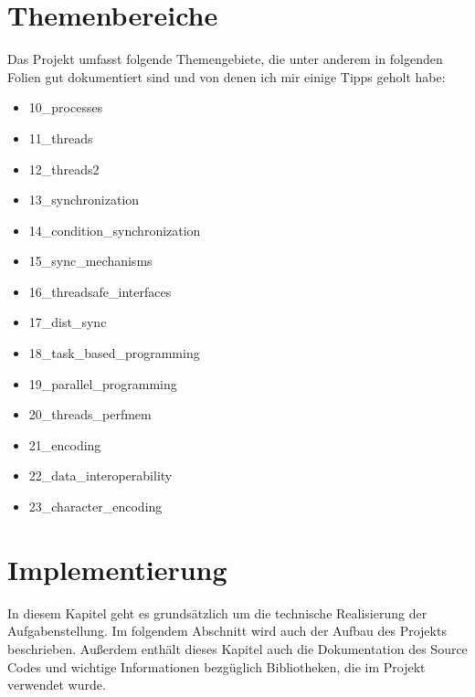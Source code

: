 \documentclass[a4paper,12pt]{article}
\begin{document}
\section{Themenbereiche}
Das Projekt umfasst folgende Themengebiete, die unter anderem in folgenden Folien gut dokumentiert sind und von denen ich mir einige Tipps geholt habe:
    \begin{itemize}
        \item  10\_processes
        \item  11\_threads
        \item  12\_threads2 
        \item  13\_synchronization 
        \item  14\_condition\_synchronization 
        \item  15\_sync\_mechanisms 
        \item  16\_threadsafe\_interfaces 
        \item  17\_dist\_sync 
        \item  18\_task\_based\_programming 
        \item  19\_parallel\_programming 
        \item  20\_threads\_perfmem
        \item  21\_encoding
        \item  22\_data\_interoperability
        \item  23\_character\_encoding
    \end{itemize} 
\newpage
\section{Implementierung}
In diesem Kapitel geht es grundsätzlich um die technische Realisierung der Aufgabenstellung. Im folgendem Abschnitt wird auch
der Aufbau des Projekts beschrieben. Außerdem enthält dieses Kapitel auch die Dokumentation des Source Codes und wichtige Informationen bezgüglich Bibliotheken, 
die im Projekt verwendet wurde. 
\end{document}

